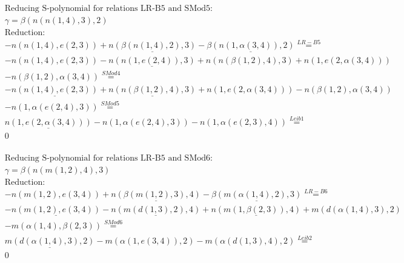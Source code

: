 \documentclass[11pt]{amsart}
\begin{document}
\begin{align*} 
& \text{Reducing S-polynomial for relations LR-B5 and SMod5:} \\ 
& \gamma = \beta(n(n(1,4),3),2) \\ 
& \text{Reduction}: \\& - n(n(1,4),e(2,3)) + \underline{n(\beta(n(1,4),2),3)} - \underline{\beta(n(1,\alpha(3,4)),2)} \stackrel{ LR-B5 }{=}  \\ 
& - n(n(1,4),e(2,3)) - \underline{n(n(1,e(2,4)),3)} + n(n(\beta(1,2),4),3) + n(1,e(2,\alpha(3,4)))\\ 
 &  - n(\beta(1,2),\alpha(3,4)) \stackrel{ SMod4 }{=}  \\ 
& - \underline{n(n(1,4),e(2,3))} + \underline{n(n(\beta(1,2),4),3)} + n(1,e(2,\alpha(3,4))) - n(\beta(1,2),\alpha(3,4))\\ 
 &  - n(1,\alpha(e(2,4),3)) \stackrel{ SMod5 }{=}  \\ 
&\underline{n(1,e(2,\alpha(3,4)))} - n(1,\alpha(e(2,4),3)) - n(1,\alpha(e(2,3),4)) \stackrel{ Leib1 }{=}  \\ 
&0\\ 
\end{align*} 
 
\begin{align*} 
& \text{Reducing S-polynomial for relations LR-B5 and SMod6:} \\ 
& \gamma = \beta(n(m(1,2),4),3) \\ 
& \text{Reduction}: \\& - n(m(1,2),e(3,4)) + \underline{n(\beta(m(1,2),3),4)} - \underline{\beta(m(\alpha(1,4),2),3)} \stackrel{ LR-B6 }{=}  \\ 
& - \underline{n(m(1,2),e(3,4))} - \underline{n(m(d(1,3),2),4)} + \underline{n(m(1,\beta(2,3)),4)} + m(d(\alpha(1,4),3),2)\\ 
 &  - m(\alpha(1,4),\beta(2,3)) \stackrel{ SMod6 }{=}  \\ 
&\underline{m(d(\alpha(1,4),3),2)} - m(\alpha(1,e(3,4)),2) - m(\alpha(d(1,3),4),2) \stackrel{ Leib2 }{=}  \\ 
&0\\ 
\end{align*} 
 
\end{document}

